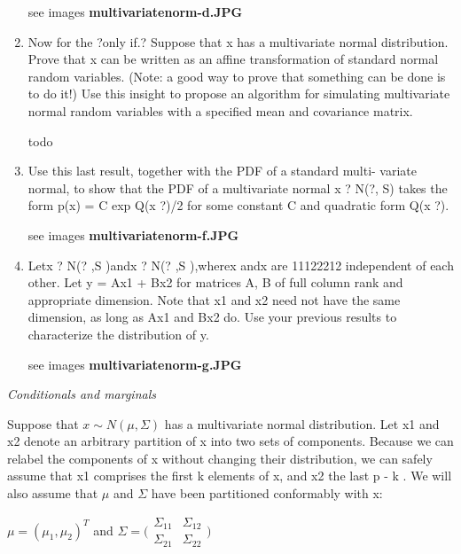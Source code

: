\documentclass{homework}
\begin{document}
\begin{enumerate}[label=(\Alph*)]
\par * see images \textbf{multivariatenorm-d.JPG}

\item Now for the ?only if.? Suppose that x has a multivariate normal distribution. Prove that x can be written as an affine transformation of standard normal random variables. (Note: a good way to prove that something can be done is to do it!) Use this insight to propose an algorithm for simulating multivariate normal random variables with a specified mean and covariance matrix.

\par todo

\item Use this last result, together with the PDF of a standard multi- variate normal, to show that the PDF of a multivariate normal
x ? N(?, S) takes the form p(x) = C exp{ Q(x   ?)/2} for some constant C and quadratic form Q(x   ?).

\par * see images \textbf{multivariatenorm-f.JPG}

\item Letx ? N(? ,S )andx ? N(? ,S ),wherex andx are 11122212
independent of each other. Let y = Ax1 + Bx2 for matrices A, B of full column rank and appropriate dimension. Note that x1 and x2 need not have the same dimension, as long as Ax1 and Bx2 do. Use your previous results to characterize the distribution of y.

\par * see images \textbf{multivariatenorm-g.JPG}

\end{enumerate}

\par \noindent \textit{Conditionals and marginals}

\par Suppose that $x \sim N(\mu, \Sigma)$ has a multivariate normal distribution. Let x1 and x2 denote an arbitrary partition of x into two sets of components. Because we can relabel the components of x without changing their distribution, we can safely assume that x1 comprises the first k elements of x, and x2 the last p - k . We will also assume that $\mu$ and $\Sigma$ have been partitioned conformably with x:


$\mu = (\mu_1,\mu_2)^T$ and $\Sigma = \big( \begin{matrix} \Sigma_{11} & \Sigma_{12} \\ \Sigma_{21} & \Sigma_{22}\end{matrix} \big)$
\end{document}
